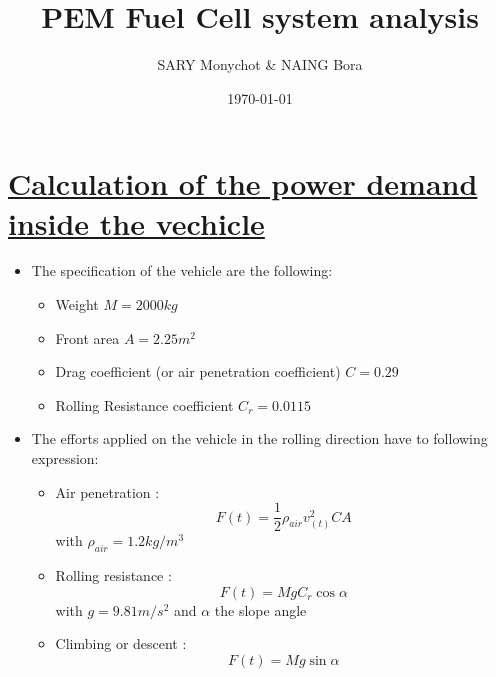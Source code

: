 \documentclass[12pt,a4paper]{article}
\numberwithin{equation}{section}
\begin{document}
	\title{\textbf{PEM Fuel Cell system analysis }}
	\author{SARY Monychot \& NAING Bora }
	\date{\today}
	\maketitle
	\tableofcontents
		\newpage
	\section{\underline{Calculation of the power demand inside the vechicle}}
	\begin{itemize}
	 \item The specification of the vehicle are the following:
	
	\begin{itemize}
		\item  Weight $M = 2000 kg$
		\item Front area $A = 2.25  m^2$
		\item Drag coefficient (or air penetration coefficient) $C = 0.29$ 
		\item Rolling Resistance coefficient $C_r = 0.0115$
		
	\end{itemize}
	
	\item The efforts applied on the vehicle in the rolling direction have to following expression:
	
	\begin{itemize}
		\item Air penetration : 
		\begin{equation}
				F{(t)} = \frac{1}{2}\rho_{air}v^2_{(t)}CA  \label{eq1}
		\end{equation} with $\rho_{air} = 1.2    kg/m^3$
		\item Rolling resistance :	
		\begin{equation}
			 F(t) = MgC_r\cos{\alpha} \label{eq2}
		\end{equation}with $g = 9.81 m/s^2$ and $\alpha$ the slope angle
		\item Climbing or descent : 
		\begin{equation}
			F(t) = Mg\sin{\alpha} \label{eq3}
		\end{equation} 
		
	\end{itemize}
	\end{itemize}
	
\end{document}
